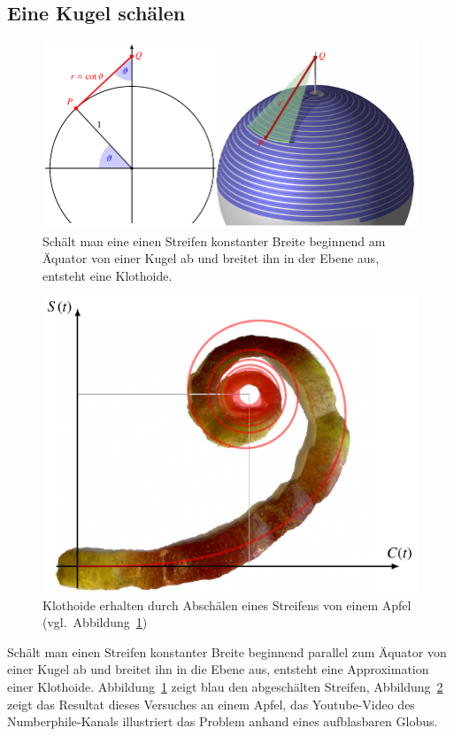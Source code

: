 \subsection{Eine Kugel schälen}
\begin{figure}
\centering
\includegraphics[width=\textwidth]{papers/fresnel/images/schale.pdf}
\caption{Schält man eine einen Streifen konstanter Breite beginnend am
Äquator von einer Kugel ab und breitet ihn in der Ebene aus, entsteht
eine Klothoide.
\label{fresnel:figure:schale}}
\end{figure}
\begin{figure}
\centering
\includegraphics{papers/fresnel/images/apfel.pdf}
\caption{Klothoide erhalten durch Abschälen eines Streifens von einem
Apfel (vgl.~Abbildung~\ref{fresnel:figure:schale})
\label{fresnel:figure:apfel}}
\end{figure}
Schält man einen Streifen konstanter Breite beginnend parallel zum Äquator
von einer Kugel ab und breitet ihn in die Ebene aus, entsteht eine
Approximation einer Klothoide.
Abbildung~\ref{fresnel:figure:schale} zeigt blau den abgeschälten Streifen,
Abbildung~\ref{fresnel:figure:apfel} zeigt das Resultat dieses Versuches
an einem Apfel, das Youtube-Video \cite{fresnel:schale} des
Numberphile-Kanals illustriert das Problem anhand eines aufblasbaren
Globus.

